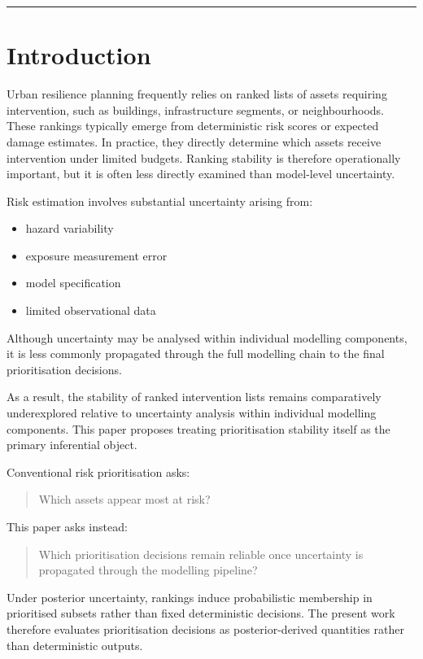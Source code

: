 \documentclass[
]{article}
\providecommand{\tightlist}{%
  \setlength{\itemsep}{0pt}\setlength{\parskip}{0pt}}
\begin{document}
\begin{center}\rule{0.5\linewidth}{0.5pt}\end{center}

\section{Introduction}\label{introduction}

Urban resilience planning frequently relies on ranked lists of assets
requiring intervention, such as buildings, infrastructure segments, or
neighbourhoods. These rankings typically emerge from deterministic risk
scores or expected damage estimates. In practice, they directly
determine which assets receive intervention under limited budgets.
Ranking stability is therefore operationally important, but it is often
less directly examined than model-level uncertainty.

Risk estimation involves substantial uncertainty arising from:

\begin{itemize}
\tightlist
\item
  hazard variability
\item
  exposure measurement error
\item
  model specification
\item
  limited observational data
\end{itemize}

Although uncertainty may be analysed within individual modelling
components, it is less commonly propagated through the full modelling
chain to the final prioritisation decisions.

As a result, the stability of ranked intervention lists remains
comparatively underexplored relative to uncertainty analysis within
individual modelling components. This paper proposes treating
prioritisation stability itself as the primary inferential object.

Conventional risk prioritisation asks:

\begin{quote}
Which assets appear most at risk?
\end{quote}

This paper asks instead:

\begin{quote}
Which prioritisation decisions remain reliable once uncertainty is
propagated through the modelling pipeline?
\end{quote}

Under posterior uncertainty, rankings induce probabilistic membership in
prioritised subsets rather than fixed deterministic decisions. The
present work therefore evaluates prioritisation decisions as
posterior-derived quantities rather than deterministic outputs.
\end{document}
